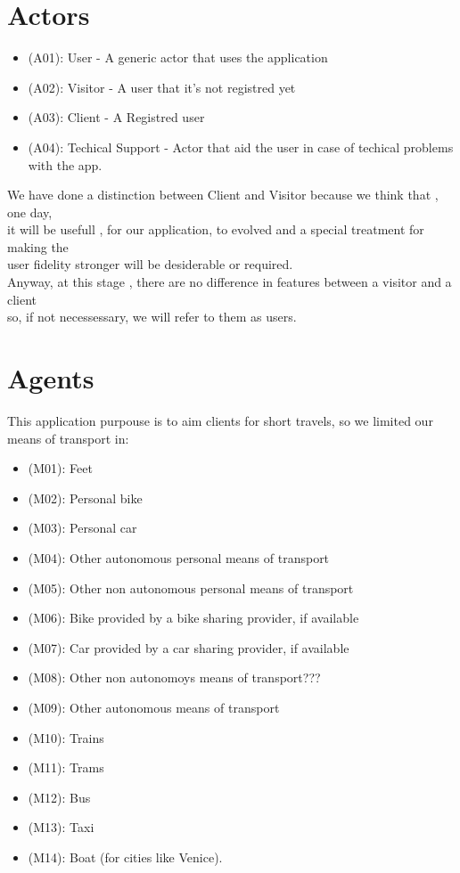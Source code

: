 \documentclass[a4paper]{book}
\begin{document}
\section{Actors}
\begin{itemize}

\item (A01): User - A generic actor that uses the application
\item (A02): Visitor - A user that it's not registred yet
\item (A03): Client - A Registred user
\item (A04): Techical Support - Actor that aid the user in case of techical problems with the app.

\end{itemize}

We have done a distinction between Client and Visitor because we think that , one day, \\
it will be usefull , for our application, to evolved and a special treatment for making the \\
user fidelity stronger will be desiderable or required.\\

Anyway, at this stage , there are no difference in features between a visitor and a client\\
so, if not necessessary, we will refer to them as users.

\section{Agents}

This application purpouse is to aim clients for short travels, so we limited our means of transport in:

\begin{itemize}

\item (M01): Feet 
\item (M02): Personal bike 
\item (M03): Personal car
\item (M04): Other autonomous personal means of transport
\item (M05): Other non autonomous personal means of transport
\item (M06): Bike provided by a bike sharing provider, if available
\item (M07): Car provided by a car sharing provider, if available
\item (M08): Other non autonomoys means of transport???
\item (M09): Other autonomous means of transport
\item (M10): Trains
\item (M11): Trams
\item (M12): Bus 
\item (M13): Taxi
\item (M14): Boat (for cities like Venice).

\end{itemize}
\end{document}
